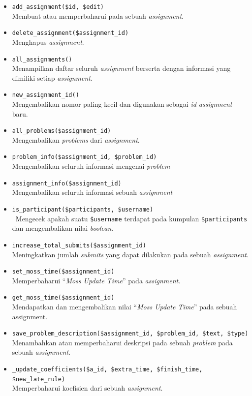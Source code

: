 \begin{itemize}
	      \begin{itemize}
		      \item \verb|add_assignment($id, $edit)| \\
		            Membuat atau memperbaharui pada sebuah \textit{assignment}.
		      \item \verb|delete_assignment($assignment_id)| \\
		            Menghapus \textit{assignment}.
		      \item \verb|all_assignments()| \\
		            Menampilkan daftar seluruh \textit{assignment} berserta dengan informasi yang dimiliki setiap \textit{assignment}.
		      \item \verb|new_assignment_id()| \\
                        Mengembalikan nomor paling kecil dan digunakan sebagai \textit{id assignment} baru.
		      \item \verb|all_problems($assignment_id)| \\
                        Mengembalikan \textit{problems} dari \textit{assignment}.
		      \item \verb|problem_info($assignment_id, $problem_id)| \\
		            Mengembalikan seluruh informasi mengenai \textit{problem}
		      \item \verb|assignment_info($assignment_id)| \\
		            Mengembalikan seluruh informasi sebuah \textit{assignment}
		      \item \verb|is_participant($participants, $username)| \\
		      \     Mengecek apakah suatu \verb|$username| terdapat pada kumpulan \verb|$participants| dan mengembalikan nilai \textit{boolean}.
		      \item \verb|increase_total_submits($assignment_id)| \\
                        Meningkatkan jumlah \textit{submits} yang dapat dilakukan pada sebuah \textit{assignment}.
		      \item \verb|set_moss_time($assignment_id)| \\
		            Memperbaharui ``\textit{Moss Update Time}'' pada \textit{assignment}.
		      \item \verb|get_moss_time($assignment_id)| \\
		            Mendapatkan dan mengembalikan nilai ``\textit{Moss Update Time}'' pada sebuah assignment.
		      \item \verb|save_problem_description($assignment_id, $problem_id, $text, $type)| \\
		            Menambahkan atau memperbaharui deskripsi pada sebuah \textit{problem} pada sebuah \textit{assignment}.
		      \item \verb|_update_coefficients($a_id, $extra_time, $finish_time, $new_late_rule)| \\
		            Memperbaharui koefisien dari sebuah \textit{assignment}.
	      \end{itemize}
		  

\end{itemize}
